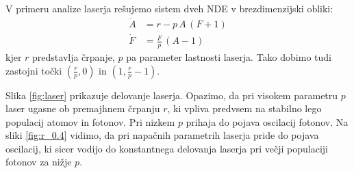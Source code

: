 V primeru analize laserja rešujemo sistem dveh NDE v brezdimenzijski obliki:
\begin{align}
    \dot A &= r - p \, A \, (F+1) \\ \nonumber
    \dot F &= \frac{F}{p} \, (A-1)
\end{align}
kjer $r$ predstavlja črpanje, $p$ pa parameter lastnosti laserja. Tako dobimo tudi zastojni točki $\left( \frac{r}{p}, 0 \right)$ in $\left( 1, \frac{r}{p} - 1 \right)$.

Slika \ref{fig:laser} prikazuje delovanje laserja. Opazimo, da pri visokem parametru $p$ laser ugasne ob premajhnem črpanju $r$, ki vpliva predvsem na stabilno lego populacij atomov in fotonov. Pri nizkem $p$ prihaja do pojava oscilacij fotonov. Na sliki \ref{fig:r_0.4} vidimo, da pri napačnih parametrih laserja pride do pojava oscilacij, ki sicer vodijo do konstantnega delovanja laserja pri večji populaciji fotonov za nižje $p$.

